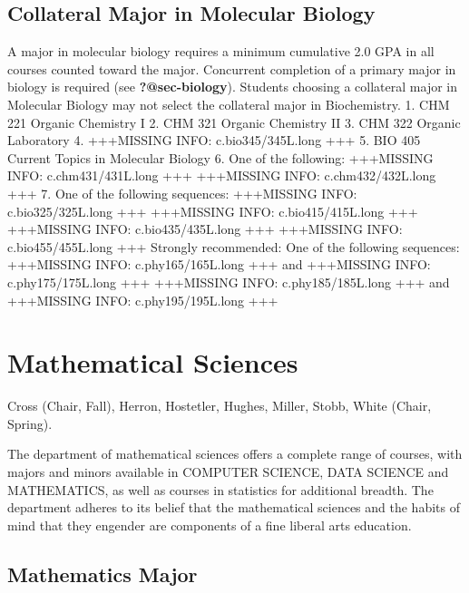 \documentclass[
  letterpaper,
]{scrbook}
\begin{document}
\subsection{Collateral Major in Molecular
Biology}\label{collateral-major-in-molecular-biology}

A major in molecular biology requires a minimum cumulative 2.0 GPA in
all courses counted toward the major. Concurrent completion of a primary
major in biology is required (see \textbf{?@sec-biology}). Students
choosing a collateral major in Molecular Biology may not select the
collateral major in Biochemistry. 1. CHM 221 Organic Chemistry I 2. CHM
321 Organic Chemistry II 3. CHM 322 Organic Laboratory 4. +++MISSING
INFO: c.bio345/345L.long +++ 5. BIO 405 Current Topics in Molecular
Biology 6. One of the following: +++MISSING INFO: c.chm431/431L.long +++
+++MISSING INFO: c.chm432/432L.long +++ 7. One of the following
sequences: +++MISSING INFO: c.bio325/325L.long +++ +++MISSING INFO:
c.bio415/415L.long +++ +++MISSING INFO: c.bio435/435L.long +++
+++MISSING INFO: c.bio455/455L.long +++ Strongly recommended: One of the
following sequences: +++MISSING INFO: c.phy165/165L.long +++ and
+++MISSING INFO: c.phy175/175L.long +++ +++MISSING INFO:
c.phy185/185L.long +++ and +++MISSING INFO: c.phy195/195L.long +++

\section{Mathematical Sciences}\label{sec-mathematical-sciences}

Cross (Chair, Fall), Herron, Hostetler, Hughes, Miller, Stobb, White
(Chair, Spring).

The department of mathematical sciences offers a complete range of
courses, with majors and minors available in COMPUTER SCIENCE, DATA
SCIENCE and MATHEMATICS, as well as courses in statistics for additional
breadth. The department adheres to its belief that the mathematical
sciences and the habits of mind that they engender are components of a
fine liberal arts education.

\subsection{Mathematics Major}\label{mathematics-major}
\end{document}
